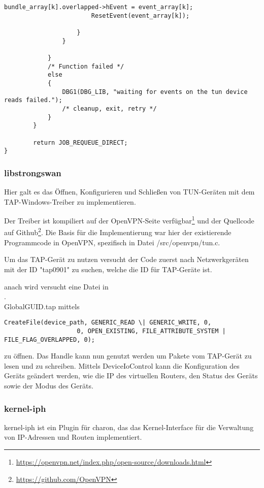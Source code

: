 \begin{lstlisting}[caption=Code für handle\_plain auf Windows]
                        bundle_array[k].overlapped->hEvent = event_array[k];
                        ResetEvent(event_array[k]);

                    }
                }

            }
            /* Function failed */
            else
            {
                DBG1(DBG_LIB, "waiting for events on the tun device reads failed.");
                /* cleanup, exit, retry */
            }
        }

        return JOB_REQUEUE_DIRECT;
}
\end{lstlisting}

\subsubsection{libstrongswan}
Hier galt es das Öffnen, Konfigurieren und Schließen von TUN-Geräten
mit dem TAP-Windows-Treiber zu implementieren.

Der Treiber ist kompiliert auf der OpenVPN-Seite
verfügbar\footnote{\url{https://openvpn.net/index.php/open-source/downloads.html}}
und der Quellcode auf Github\footnote{\url{https://github.com/OpenVPN}}.
Die Basis für die Implementierung war hier der existierende Programmcode in
OpenVPN, spezifisch in Datei /src/openvpn/tun.c.

Um das TAP-Gerät zu nutzen versucht der Code zuerst nach Netzwerkgeräten mit der ID "tap0901" zu suchen,
welche die ID für TAP-Geräte ist.

anach wird versucht eine Datei in \\.\\Global\/GUID.tap mittels 
\begin{lstlisting}
CreateFile(device_path, GENERIC_READ \| GENERIC_WRITE, 0,
                    0, OPEN_EXISTING, FILE_ATTRIBUTE_SYSTEM | FILE_FLAG_OVERLAPPED, 0);
\end{lstlisting}
zu öffnen.
Das Handle kann nun genutzt werden um Pakete vom TAP-Gerät zu lesen und zu schreiben.
Mittels DeviceIoControl kann die Konfiguration des Geräts geändert werden,
wie die IP des virtuellen Routers, den Status des Geräts sowie der Modus des Geräts.



\subsubsection{kernel-iph}
kernel-iph ist ein Plugin für charon, das das Kernel-Interface
für die Verwaltung von IP-Adressen und Routen implementiert.

